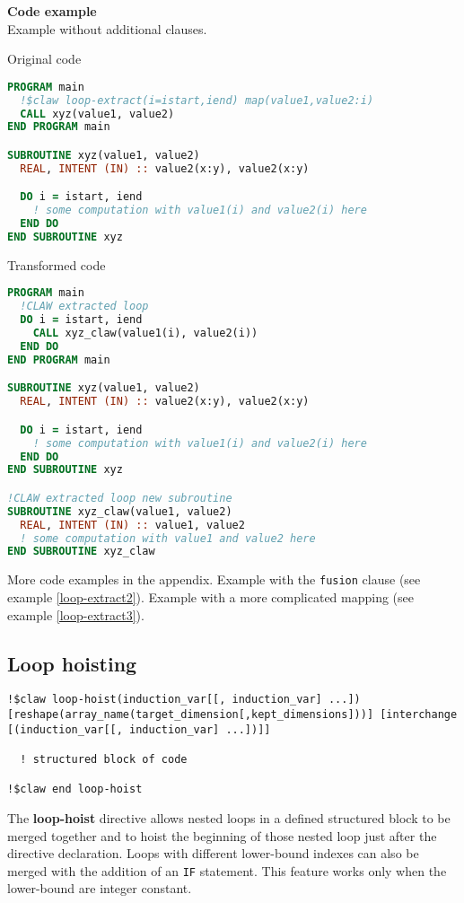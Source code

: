 \textbf{Code example}\\
\label{loop-extract1}
Example without additional clauses.

Original code
\begin{lstlisting}[language=Fortran]
PROGRAM main
  !$claw loop-extract(i=istart,iend) map(value1,value2:i)
  CALL xyz(value1, value2)
END PROGRAM main

SUBROUTINE xyz(value1, value2)
  REAL, INTENT (IN) :: value2(x:y), value2(x:y)

  DO i = istart, iend
    ! some computation with value1(i) and value2(i) here
  END DO
END SUBROUTINE xyz
\end{lstlisting}


Transformed code
\begin{lstlisting}[language=Fortran]
PROGRAM main
  !CLAW extracted loop
  DO i = istart, iend
    CALL xyz_claw(value1(i), value2(i))
  END DO
END PROGRAM main

SUBROUTINE xyz(value1, value2)
  REAL, INTENT (IN) :: value2(x:y), value2(x:y)

  DO i = istart, iend
    ! some computation with value1(i) and value2(i) here
  END DO
END SUBROUTINE xyz

!CLAW extracted loop new subroutine
SUBROUTINE xyz_claw(value1, value2)
  REAL, INTENT (IN) :: value1, value2
  ! some computation with value1 and value2 here
END SUBROUTINE xyz_claw
\end{lstlisting}

More code examples in the appendix. Example with the \lstinline!fusion! clause (see example \ref{loop-extract2}). Example with a more complicated mapping (see example \ref{loop-extract3}).

\subsection{Loop hoisting}
\begin{lstlisting}
!$claw loop-hoist(induction_var[[, induction_var] ...]) [reshape(array_name(target_dimension[,kept_dimensions]))] [interchange [(induction_var[[, induction_var] ...])]]

  ! structured block of code

!$claw end loop-hoist
\end{lstlisting}

The \textbf{loop-hoist} directive allows nested loops in a defined structured block to
be merged together and to hoist the beginning of those nested loop just after
the directive declaration. Loops with different lower-bound indexes
can also be merged with the addition of an \lstinline!IF! statement. This feature works
only when the lower-bound are integer constant.


